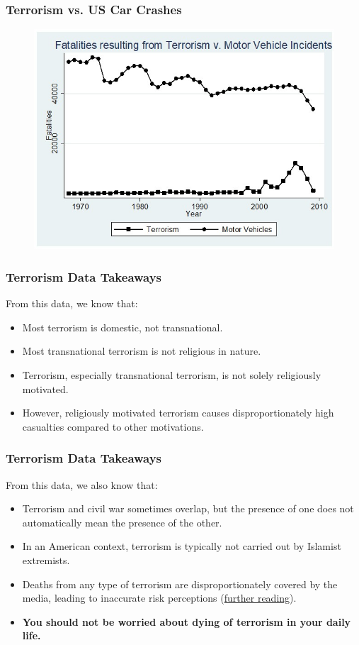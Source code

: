 \documentclass[handout]{beamer}
\begin{document}
\begin{frame} 
	\frametitle{\LARGE{Terrorism vs. US Car Crashes}}
	\begin{figure}[ht!]
		\centering
		\includegraphics[width=\textwidth,height=.9\textheight,keepaspectratio]{crashes.jpg}
	\end{figure}
\end{frame}

\begin{frame} 
	\frametitle{\LARGE{Terrorism Data Takeaways}}
	From this data, we know that:
	\begin{itemize}
		\item Most terrorism is domestic, not transnational. \pause
		\item Most transnational terrorism is not religious in nature. \pause
		\item Terrorism, especially transnational terrorism, is not solely religiously motivated. \pause
		\item However, religiously motivated terrorism causes disproportionately high casualties compared to other motivations. 
		
	\end{itemize}
\end{frame}

\begin{frame} 
	\frametitle{\LARGE{Terrorism Data Takeaways}}
From this data, we also know that:
	\begin{itemize}
		\item Terrorism and civil war sometimes overlap, but the presence of one does not automatically mean the presence of the other. \pause
		\item In an American context, terrorism is typically not carried out by Islamist extremists. \pause
		\item Deaths from any type of terrorism are disproportionately covered by the media, leading to inaccurate risk perceptions (\href{https://ourworldindata.org/terrorism}{further reading}). \pause
		\item \textbf{You should not be worried about dying of terrorism in your daily life.}
		
	\end{itemize}
\end{frame}
\end{document}
